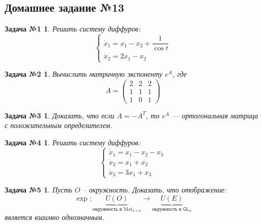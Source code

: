 \documentclass[a4paper,12pt]{article}
\newtheorem*{task1}{Задача №1}
\newtheorem*{task2}{Задача №2}
\newtheorem*{task3}{Задача №3}
\newtheorem*{task4}{Задача №4}
\newtheorem*{task5}{Задача №5}
\newcommand{\Mat}{\mathrm{Mat}}
\newcommand{\dx}{\dot{x}}
\renewcommand{\to}{\longrightarrow}
\begin{document}
\subsection{Домашнее задание №13}


\begin{task1}
	Решить систему диффуров:
	\[\begin{cases}
	\dx_1 = x_1 - x_2 + \dfrac{1}{\cos t}\\
	\dx_2 = 2x_1 - x_2
	\end{cases}\]
\end{task1}
%

\begin{task2}
	Вычислить матричную экспоненту $e^A$, где
	\[A = \begin{pmatrix}
		2 & 2 & 2\\
		1 & 1 & 1\\
		1 & 0 & 1
	\end{pmatrix}\]
\end{task2}
%

\begin{task3}
	Доказать, что если $A = -A^T$, то $e^A$ --- ортогональная матрица с положительным определителем.
\end{task3}
%	

\begin{task4}
	Решить систему диффуров:
	\[\begin{cases}
	\dx_1 = x_1 - x_2 - x_3\\
	\dx_2 = x_1 + x_2\\
	\dx_3 = 3x_1 + x_3
	\end{cases}\]
\end{task4}
%

\begin{task5}
	Пусть $O$ -- окружность.
	Доказать, что отображение:
	\[\exp: \underbrace{U(O)}_{\text{окружность в }\Mat_{n\times n}} \to \underbrace{U(E)}_{\text{окружность в }\mathsf{GL}_n}\]
	является взаимно однозначным.
\end{task5}
%
\end{document}
